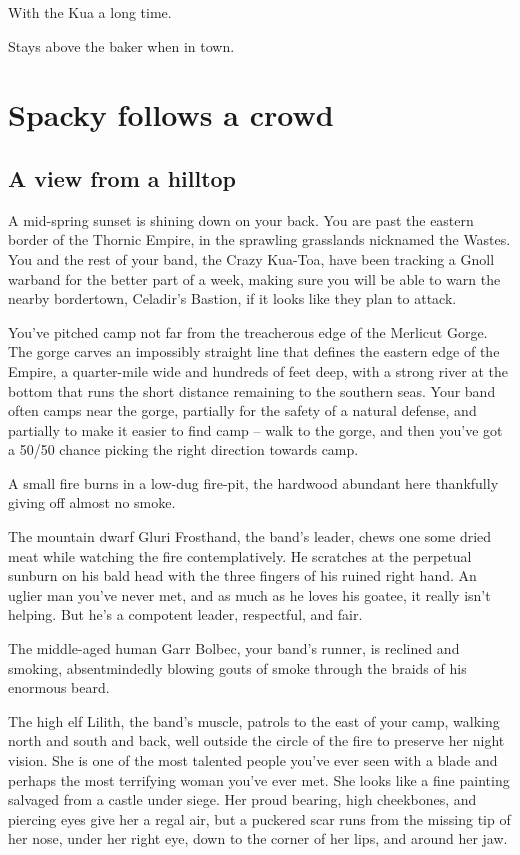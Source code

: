 With the Kua a long time.

Stays above the baker when in town.




\section{Spacky follows a crowd}
\begin{multicols}{2}
\subsection{A view from a hilltop}
  \begin{aloud}
  A mid-spring sunset is shining down on your back.
  You are past the eastern border of the Thornic Empire, in the sprawling grasslands
    nicknamed the Wastes.
  You and the rest of your band, the Crazy Kua-Toa, have been tracking a Gnoll warband for the
    better part of a week, making sure you will be able to warn the nearby bordertown,
    Celadir's Bastion, if it looks like they plan to attack.
  \end{aloud}

You've pitched camp not far from the treacherous edge of the Merlicut Gorge.
The gorge carves an impossibly straight line that defines the eastern edge of the Empire,
  a quarter-mile wide and hundreds of feet deep, with a strong river at the bottom that runs
  the short distance remaining to the southern seas.
Your band often camps near the gorge, partially for the safety of a natural defense, and partially
  to make it easier to find camp -- walk to the gorge, and then you've got a 50/50 chance
  picking the right direction towards camp.

A small fire burns in a low-dug fire-pit, the hardwood abundant here thankfully giving off
  almost no smoke.

The mountain dwarf Gluri Frosthand, the band's leader, chews one some dried meat while watching
  the fire contemplatively.
He scratches at the perpetual sunburn on his bald head with the three fingers of his ruined right
  hand.
An uglier man you've never met, and as much as he loves his goatee, it really isn't helping.
But he's a compotent leader, respectful, and fair.

The middle-aged human Garr Bolbec, your band's runner, is reclined and smoking, absentmindedly
  blowing gouts of smoke through the braids of his enormous beard.

The high elf Lilith, the band's muscle, patrols to the east of your camp, walking north and south
  and back, well outside the circle of the fire to preserve her night vision.
She is one of the most talented people you've ever seen with a blade and perhaps the most
  terrifying woman you've ever met.
She looks like a fine painting salvaged from a castle under siege.
Her proud bearing, high cheekbones, and piercing eyes give her a regal air, but a puckered scar
  runs from the missing tip of her nose, under her right eye, down to the corner of her lips,
  and around her jaw.


\end{multicols}
